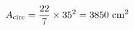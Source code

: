 \documentclass[preview]{standalone}
\begin{document}
\begin{align*}
\special{dvisvgm:raw <g id='unique000'>}A_{\text{circ}} = \frac{22}{7} \times 35^2 = 3850 \text{ cm}^2\special{dvisvgm:raw </g>}
\end{align*}
\end{document}
